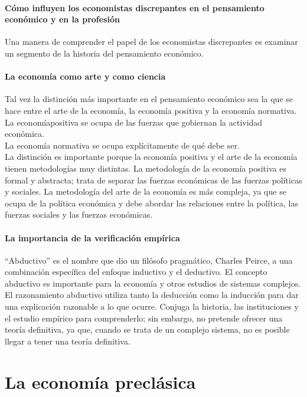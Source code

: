 \documentclass[10pt]{book}
\begin{document}
\subsection*{Cómo influyen los economistas discrepantes en el pensamiento económico y en la profesión}
Una manera de comprender el papel de los economistas discrepantes es examinar un segmento de la historia del pensamiento económico. 

\subsection*{La economía como arte y como ciencia}
Tal vez la distinción más importante en el pensamiento económico sea la que se hace entre el arte de la economía, la economía positiva y la economía normativa. La economíapositiva se ocupa de las fuerzas que gobiernan la actividad económica.\\
La economía normativa se ocupa explícitamente de qué debe ser.\\
La distinción es importante porque la economía positiva y el arte de la economía tienen metodologías muy distintas. La metodología de la economía positiva es formal y abstracta; trata de separar las fuerzas económicas de las fuerzas políticas y sociales. La metodología del arte de la economía es más compleja, ya que se ocupa de la política económica y debe abordar las relaciones entre la política, las fuerzas sociales y las fuerzas económicas.\\
\subsection*{La importancia de la verificación empírica}
$“$Abductivo$”$ es el nombre que dio un filósofo pragmático, Charles Peirce, a una combinación específica del enfoque inductivo y el deductivo. El concepto abductivo es importante para la economía y otros estudios de sistemas complejos. El razonamiento abductivo utiliza tanto la deducción como la inducción para dar una explicación razonable a lo que ocurre. Conjuga la historia, las instituciones y el estudio empírico para comprenderlo; sin embargo, no pretende ofrecer una teoría definitiva, ya que, cuando se trata de un complejo sistema, no es posible llegar a tener una teoría definitiva.\\
\part{La economía preclásica} 
\end{document}
